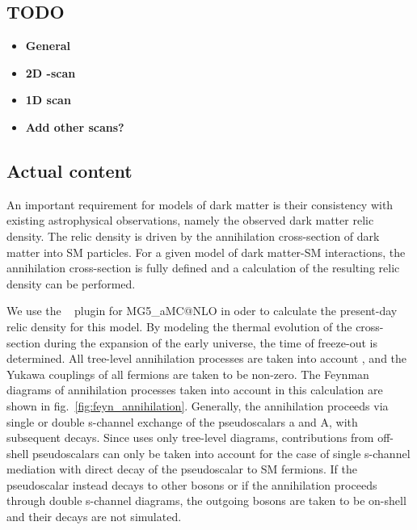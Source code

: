 \newcommand{\mgamcnlo}{MG5\_aMC@NLO\xspace}
\newcommand{\A}{A}

\subsection{\color{red} TODO}
\begin{itemize}
\color{red}

\item{\textbf{General}}
\item{\textbf{2D \mDM-\mA scan}}
\item{\textbf{1D \mDM scan}}
\item{\textbf{Add other scans?}}

\end{itemize}

\subsection{Actual content}

An important requirement for models of dark matter is their consistency with existing astrophysical observations, namely the observed dark matter relic density.
The relic density is driven by the annihilation cross-section of dark matter into SM particles.
For a given model of dark matter-SM interactions, the annihilation cross-section is fully defined and a calculation of the resulting relic density can be performed. 

We use the \maddm~\cite{Backovic:2013dpa,Backovic:2015cra} plugin for \mgamcnlo in oder to calculate the present-day relic density for this model. By modeling the thermal evolution of the cross-section during the expansion of the early universe, the time of freeze-out is determined. All tree-level annihilation processes are taken into account , and the Yukawa couplings of all fermions are taken to be non-zero. The Feynman diagrams of annihilation processes taken into account in this calculation are shown in fig.~\ref{fig:feyn_annihilation}. Generally, the annihilation proceeds via single or double s-channel exchange of the pseudoscalars a and A, with subsequent decays. Since \maddm uses only tree-level diagrams, contributions from off-shell pseudoscalars can only be taken into account for the case of single s-channel mediation with direct decay of the pseudoscalar to SM fermions. If the pseudoscalar instead decays to other bosons or if the annihilation proceeds through double s-channel diagrams, the outgoing bosons are taken to be on-shell and their decays are not simulated. 

